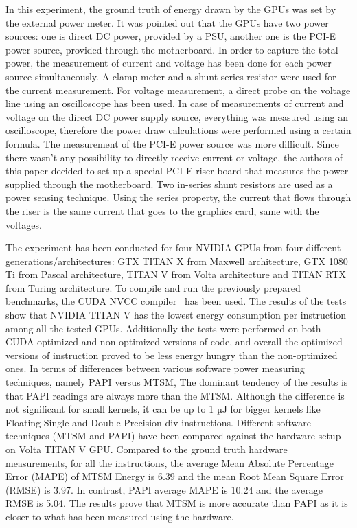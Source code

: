 In this experiment, the ground truth of energy drawn by the GPUs
was set by the external power meter. It was pointed out that the
GPUs have two power sources: one is direct DC power, provided by
a PSU, another one is the PCI-E power source, provided through
the motherboard. In order to capture the total power, the
measurement of current and voltage has been done for each power
source simultaneously. A clamp meter and a shunt series resistor
were used for the current measurement. For voltage measurement,
a direct probe on the voltage line using an oscilloscope has been
used. In case of measurements of current and voltage on the direct
DC power supply source, everything was measured using an
oscilloscope, therefore the power draw calculations were performed
using a certain formula. The measurement of the PCI-E power source
was more difficult. Since there wasn't any possibility to directly
receive current or voltage, the authors of this paper decided to
set up a special PCI-E riser board that measures the power supplied
through the motherboard. Two in-series shunt resistors are used as
a power sensing technique. Using the series property, the current
that flows through the riser is the same current that goes to the
graphics card, same with the voltages.

The experiment has been conducted for four NVIDIA GPUs from four
different generations/architectures: GTX TITAN X from Maxwell
architecture, GTX 1080 Ti from Pascal architecture, TITAN V from
Volta architecture and TITAN RTX from Turing architecture. To
compile and run the previously prepared benchmarks, the CUDA NVCC
compiler~\cite{NVIDIA_NVCC} has been used. The results of the
tests show that NVIDIA TITAN V has the lowest energy consumption
per instruction among all the tested GPUs. Additionally the tests
were performed on both CUDA optimized and non-optimized versions
of code, and overall the optimized versions of instruction proved
to be less energy hungry than the non-optimized ones. In terms of
differences between various software power measuring techniques,
namely PAPI versus MTSM, The dominant tendency of the results is
that PAPI readings are always more than the MTSM\@. Although the
difference is not significant for small kernels, it can be up to
1 µJ for bigger kernels like Floating Single and Double Precision
div instructions. Different software techniques (MTSM and PAPI)
have been compared against the hardware setup on Volta TITAN V GPU\@.
Compared to the ground truth hardware measurements, for all the
instructions, the average Mean Absolute Percentage Error (MAPE)
of MTSM Energy is 6.39 and the mean Root Mean Square Error (RMSE)
is 3.97. In contrast, PAPI average MAPE is 10.24 and the average
RMSE is 5.04. The results prove that MTSM is more accurate than
PAPI as it is closer to what has been measured using the hardware.

